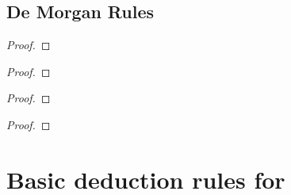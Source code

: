 \begin{multicols}{3}
%
%

\subsection*{De Morgan Rules}
\begin{proof}
\end{proof}
\begin{proof}
\end{proof}
\begin{proof}
\end{proof}
\begin{proof}
\end{proof}
\end{multicols}


\section*{Basic deduction rules for \FOL}

